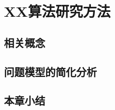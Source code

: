 \chapter{XX算法研究方法}


\section{相关概念} \label{sec:2-background}



\section{问题模型的简化分析}\label{sec:2-reduction}


\section{本章小结}
